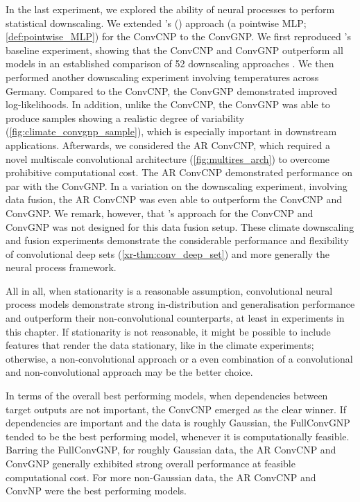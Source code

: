 \documentclass[12pt, twoside]{report}
\newcommand{\xrprefix}[1]{xr-#1}
\begin{document}
In the last experiment, we explored the ability of neural processes to perform statistical downscaling.
We extended \citeauthor{Vaughan:2022:Convolutional_Conditional_Neural_Processes_for}'s (\citeyear{Vaughan:2022:Convolutional_Conditional_Neural_Processes_for}) approach (a pointwise MLP; \cref{def:pointwise_MLP}) for the ConvCNP to the ConvGNP.
We first reproduced \citeauthor{Vaughan:2022:Convolutional_Conditional_Neural_Processes_for}'s baseline experiment, showing that the ConvCNP and ConvGNP outperform all models in an established comparison of 52 downscaling approaches \parencite[\url{http://www.value-cost.eu};][]{Maraun:2015:VALUE_A_Framework_to_Validate,Gutirrez:2019:An_Intercomparison_of_a_Large}.
We then performed another downscaling experiment involving temperatures across Germany.
Compared to the ConvCNP, the ConvGNP demonstrated improved log-likelihoods.
In addition, unlike the ConvCNP, the ConvGNP was able to produce samples showing a realistic degree of variability (\cref{fig:climate_convgnp_sample}), which is especially important in downstream applications.
Afterwards, we considered the AR ConvCNP, which required a novel multiscale convolutional architecture (\cref{fig:multires_arch}) to overcome prohibitive computational cost.
The AR ConvCNP demonstrated performance on par with the ConvGNP.
In a variation on the downscaling experiment, involving data fusion, the AR ConvCNP was even able to outperform the ConvCNP and ConvGNP.
We remark, however, that \citeauthor{Vaughan:2022:Convolutional_Conditional_Neural_Processes_for}'s approach for the ConvCNP and ConvGNP was not designed for this data fusion setup. 
These climate downscaling and fusion experiments demonstrate the considerable performance and flexibility of convolutional deep sets (\cref{\xrprefix{thm:conv_deep_set}}) and more generally the neural process framework.


All in all, when stationarity is a reasonable assumption,
convolutional neural process models
demonstrate strong in-distribution and generalisation performance and
outperform their non-convolutional counterparts,
at least in experiments in this chapter.
If stationarity is not reasonable, it might be possible to include features that render the data stationary, like in the climate experiments;
otherwise, a non-convolutional approach or a even combination of a convolutional and non-convolutional approach may be the better choice.

In terms of the overall best performing models,
when dependencies between target outputs are not important, the ConvCNP emerged as the clear winner.
If dependencies are important and the data is roughly Gaussian, the FullConvGNP tended to be the best performing model, whenever it is computationally feasible.
Barring the FullConvGNP, for roughly Gaussian data, the AR ConvCNP and ConvGNP generally exhibited strong overall performance at feasible computational cost.
For more non-Gaussian data, the AR ConvCNP and ConvNP were the best performing models.
\end{document}
